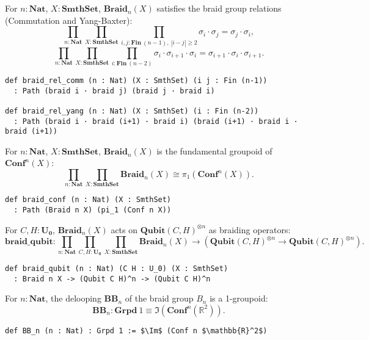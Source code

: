 \documentclass{article}
\begin{document}
\begin{theorem}\label{thm:braid-relations}
For $n : \mathbf{Nat}$, $X : \mathbf{SmthSet}$, $\mathbf{Braid}_n(X)$
satisfies the braid group relations (Commutation and Yang-Baxter):
\[
\prod_{n : \mathbf{Nat}} \prod_{X : \mathbf{SmthSet}}
\prod_{i, j : \mathbf{Fin}\ (n-1),\ |i-j|\geq 2}
\sigma_i \cdot \sigma_j = \sigma_j \cdot \sigma_i,
\]
\[
\prod_{n : \mathbf{Nat}} \prod_{X : \mathbf{SmthSet}}
\prod_{i : \mathbf{Fin}\ (n-2)}
\sigma_i \cdot \sigma_{i+1} \cdot \sigma_i = \sigma_{i+1} \cdot \sigma_i \cdot \sigma_{i+1}.
\]
\begin{lstlisting}[mathescape=true]
def braid_rel_comm (n : Nat) (X : SmthSet) (i j : Fin (n-1))
  : Path (braid i · braid j) (braid j · braid i)

def braid_rel_yang (n : Nat) (X : SmthSet) (i : Fin (n-2))
  : Path (braid i · braid (i+1) · braid i) (braid (i+1) · braid i · braid (i+1))
\end{lstlisting}
\end{theorem}

\begin{theorem}\label{thm:braid-conf}
For $n : \mathbf{Nat}$, $X : \mathbf{SmthSet}$, $\mathbf{Braid}_n(X)$ is the fundamental groupoid of $\mathbf{Conf}^n(X)$:
\[
\prod_{n : \mathbf{Nat}} \prod_{X : \mathbf{SmthSet}}
\mathbf{Braid}_n(X) \cong \pi_1(\mathbf{Conf}^n(X)).
\]
\begin{lstlisting}[mathescape=true]
def braid_conf (n : Nat) (X : SmthSet)
  : Path (Braid n X) (pi_1 (Conf n X))
\end{lstlisting}
\end{theorem}

\begin{theorem}\label{thm:braid-qubit}
For $C, H : \mathbf{U_0}$, $\mathbf{Braid}_n(X)$ acts on $\mathbf{Qubit}(C, H)^{\otimes n}$ as braiding operators:
\[
\mathbf{braid\_qubit} :
\prod_{n : \mathbf{Nat}} \prod_{C, H : \mathbf{U_0}} \prod_{X : \mathbf{SmthSet}}
\mathbf{Braid}_n(X) \to
\left( \mathbf{Qubit}(C, H)^{\otimes n} \to \mathbf{Qubit}(C, H)^{\otimes n} \right).
\]
\begin{lstlisting}[mathescape=true]
def braid_qubit (n : Nat) (C H : U_0) (X : SmthSet)
  : Braid n X -> (Qubit C H)^n -> (Qubit C H)^n
\end{lstlisting}
\end{theorem}

\begin{theorem}\label{thm:braid-delooping}
For $n : \mathbf{Nat}$, the delooping $\mathbf{BB}_n$ of the braid group $B_n$ is a 1-groupoid:
\[
\mathbf{BB}_n : \mathbf{Grpd}\ 1 \equiv \Im(\mathbf{Conf}^n(\mathbb{R}^2)).
\]
\begin{lstlisting}[mathescape=true]
def BB_n (n : Nat) : Grpd 1 := $\Im$ (Conf n $\mathbb{R}^2$)
\end{lstlisting}
\end{theorem}
\end{document}
